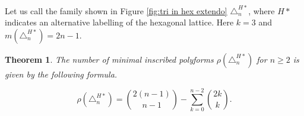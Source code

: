 \documentclass[12pt]{article}
\newtheorem{theorem}{Theorem}
\theoremstyle{plain}
\theoremstyle{definition}
\theoremstyle{remark}
\theoremstyle{definition}
\begin{document}
\begin{center}
\begin{minipage}{0.25\textwidth}
    \end{minipage}
    \label{fig:tri in hex extendo}
\end{center}

Let us call the family shown in Figure \ref{fig:tri in hex extendo} $\triangle^{H*}_n$, where $H*$ indicates an alternative labelling of the hexagonal lattice. Here $k=3$ and $m(\triangle^{H*}_n) = 2n-1$.

\begin{theorem}\label{thm: tri in hex ex}
The number of minimal inscribed polyforms $\rho(\triangle^{H*}_n)$ for $n\geq 2$ is given by the following formula.

\begin{equation}\label{eq: tri in hexagons}
    \rho(\triangle^{H*}_n) = \binom{2(n-1)}{n-1} - \sum_{k=0}^{n-2}\binom{2k}{k}.
\end{equation}
\end{theorem}
\end{document}
